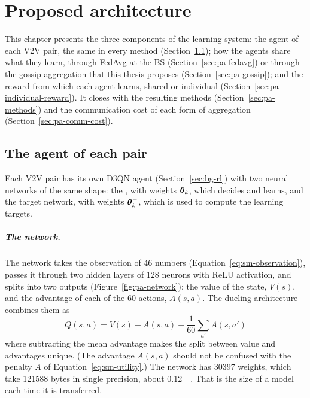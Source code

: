 \chapter{Proposed architecture}
\label{chap:proposed-architecture}

This chapter presents the three components of the learning system: the agent of each \ac{V2V} pair, the
same in every method (Section~\ref{sec:pa-agent}); how the agents share what they learn, through \ac{FedAvg}
at the \ac{BS} (Section~\ref{sec:pa-fedavg}) or through the gossip aggregation that this thesis proposes
(Section~\ref{sec:pa-gossip}); and the reward from which each agent learns, shared or individual
(Section~\ref{sec:pa-individual-reward}). It closes with the resulting methods
(Section~\ref{sec:pa-methods}) and the communication cost of each form of aggregation
(Section~\ref{sec:pa-comm-cost}).

\section{The agent of each pair}
\label{sec:pa-agent}

Each \ac{V2V} pair has its own \ac{D3QN} agent (Section~\ref{sec:bg-rl}) with two neural networks of the
same shape: the , with weights $\bm{\theta}_k$, which decides and learns, and the target
network, with weights $\bm{\theta}_k^{-}$, which is used to compute the learning targets.

\paragraph{The network.} The network takes the observation of 46 numbers (Equation~\ref{eq:sm-observation}),
passes it through two hidden layers of 128 neurons with ReLU activation, and splits into two outputs
(Figure~\ref{fig:pa-network}): the value of the state, $V(s)$, and the advantage of each of the 60 actions,
$A(s, a)$. The dueling architecture \cite{wang+16dueling} combines them as
\begin{equation}
  Q(s, a) = V(s) + A(s, a) - \frac{1}{60} \sum_{a'} A(s, a')
  \label{eq:pa-dueling}
\end{equation}
where subtracting the mean advantage makes the split between value and advantages unique. (The advantage
$A(s, a)$ should not be confused with the penalty $A$ of Equation~\ref{eq:sm-utility}.) The network has
\num{30397} weights, which take \num{121588} bytes in single precision, about \SI{0.12}{\mega\byte}. That is
the size of a model each time it is transferred.

